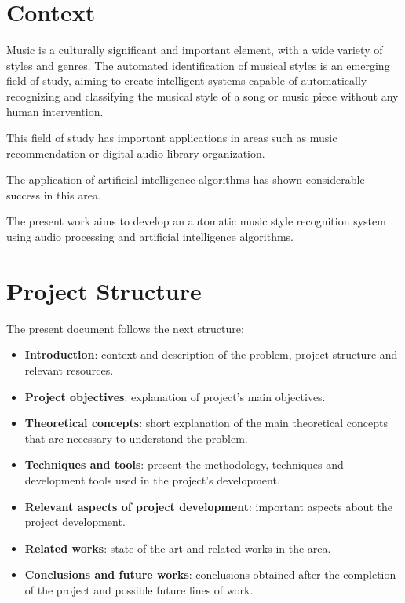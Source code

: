 
\section{Context}
Music is a culturally significant and important element, with a wide variety of styles and genres.
The automated identification of musical styles is an emerging field of study, aiming to create intelligent systems capable of automatically recognizing and classifying the musical style of a song or music piece without any human intervention.

This field of study has important applications in areas such as music recommendation or digital audio library organization.

The application of artificial intelligence algorithms has shown considerable success in this area.

The present work aims to develop an automatic music style recognition system using audio processing and artificial intelligence algorithms.

\section{Project Structure}
The present document follows the next structure:

\begin{itemize}
\tightlist
\item \textbf{Introduction}: context and description of the problem,  project structure and relevant resources.
\item \textbf{Project objectives}: explanation of project's main objectives.
\item \textbf{Theoretical concepts}: short explanation of the main theoretical concepts that are necessary to understand the problem.
\item \textbf{Techniques and tools}: present the methodology, techniques and development tools used in the project's development.
\item \textbf{Relevant aspects of project development}: important aspects about the project development.
\item \textbf{Related works}: state of the art and related works in the area.
\item \textbf{Conclusions and future works}: conclusions obtained after the completion of the project and possible future lines of work.
\end{itemize}

